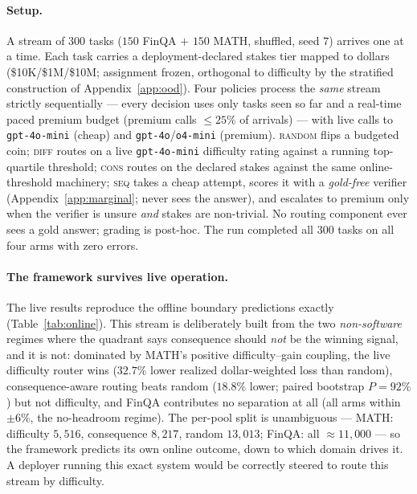 \documentclass{article}
\begin{document}
\paragraph{Setup.} A stream of $300$ tasks ($150$ FinQA
$+$ $150$ MATH, shuffled, seed $7$) arrives one at a time. Each task
carries a deployment-declared stakes tier mapped to dollars
(\$10K/\$1M/\$10M; assignment frozen,
orthogonal to difficulty by the stratified construction of
Appendix~\ref{app:ood}). Four policies process the \emph{same}
stream strictly sequentially --- every decision uses only tasks seen
so far and a real-time paced premium budget (premium calls
$\le 25\%$ of arrivals) --- with live calls to
\texttt{gpt-4o-mini} (cheap) and \texttt{gpt-4o}/\texttt{o4-mini}
(premium). \textsc{random} flips a budgeted coin; \textsc{diff}
routes on a live \texttt{gpt-4o-mini} difficulty rating against a
running top-quartile threshold; \textsc{cons} routes on the declared
stakes against the same online-threshold machinery; \textsc{seq}
takes a cheap attempt, scores it with a \emph{gold-free} verifier
(Appendix~\ref{app:marginal}; never sees the answer), and escalates
to premium only when the verifier is unsure \emph{and} stakes are
non-trivial. No routing component ever sees a gold answer; grading is
post-hoc. The run completed all $300$ tasks on all four arms with zero
errors.

\paragraph{The framework survives live operation.} The live
results reproduce the offline boundary predictions exactly
(Table~\ref{tab:online}). This stream is deliberately built from the
two \emph{non-software} regimes where the quadrant says consequence
should \emph{not} be the winning signal, and it is not: dominated by
MATH's positive difficulty--gain coupling, the live difficulty router
wins ($32.7\%$ lower realized dollar-weighted loss than random),
consequence-aware routing beats random ($18.8\%$ lower; paired bootstrap
$P = 92\%$) but not difficulty, and FinQA contributes no separation
at all (all arms within $\pm6\%$, the no-headroom regime). The
per-pool split is unambiguous --- MATH: difficulty $5{,}516$,
consequence $8{,}217$, random $13{,}013$; FinQA: all $\approx
11{,}000$ --- so the framework predicts its own online outcome, down
to which domain drives it. A deployer running this exact system would
be correctly steered to route this stream by difficulty.
\end{document}
